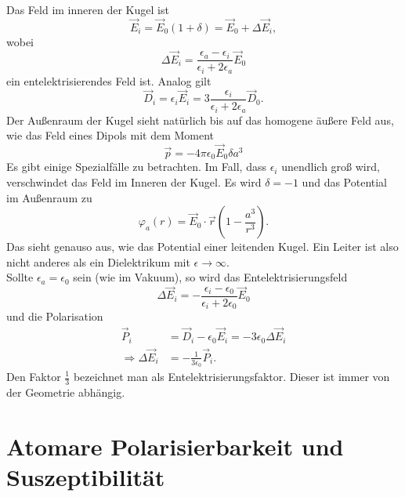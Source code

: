 Das Feld im inneren der Kugel ist
\begin{equation*}
\vec{E}_i = \vec{E}_0(1+\delta) = \vec{E}_0 + \Delta\vec{E}_i,
\end{equation*}
wobei
\begin{equation*}
\Delta\vec{E}_i = \frac{\epsilon_a-\epsilon_i}{\epsilon_i+2\epsilon_a}\vec{E}_0
\end{equation*}
ein entelektrisierendes Feld ist. Analog gilt
\begin{equation*}
\vec{D}_i = \epsilon_i\vec{E}_i = 3\frac{\epsilon_i}{\epsilon_i+2\epsilon_a}\vec{D}_0.
\end{equation*}
Der Außenraum der Kugel sieht natürlich bis auf das homogene äußere Feld aus, wie das Feld eines Dipols mit dem Moment
\begin{equation*}
\vec{p} = -4\pi\epsilon_0\vec{E}_0\delta a^3
\end{equation*}
Es gibt einige Spezialfälle zu betrachten. Im Fall, dass $\epsilon_i$ unendlich groß wird, verschwindet das Feld im Inneren der Kugel. Es wird $\delta=-1$ und das Potential im Außenraum zu
\begin{equation*}
\varphi_a(r)=\vec{E}_0\cdot\vec{r}\left(1-\frac{a^3}{r^3}\right).
\end{equation*}
Das sieht genauso aus, wie das Potential einer leitenden Kugel. Ein Leiter ist also nicht anderes als ein Dielektrikum mit $\epsilon\rightarrow\infty$.\\
Sollte $\epsilon_a=\epsilon_0$ sein (wie im Vakuum), so wird das Entelektrisierungsfeld
\begin{equation*}
\Delta\vec{E}_i=-\frac{\epsilon_i-\epsilon_0}{\epsilon_i+2\epsilon_0}\vec{E}_0
\end{equation*}
und die Polarisation
\begin{align*}
\vec{P}_i &= \vec{D}_i - \epsilon_0\vec{E}_i = -3\epsilon_0\Delta\vec{E}_i\\
\Rightarrow \Delta\vec{E}_i &= -\frac{1}{3\epsilon_0}\vec{P}_i.
\end{align*}
Den Faktor $\frac{1}{3}$ bezeichnet man als Entelektrisierungsfaktor. Dieser ist immer von der Geometrie abhängig. 

\section{Atomare Polarisierbarkeit und Suszeptibilität}

